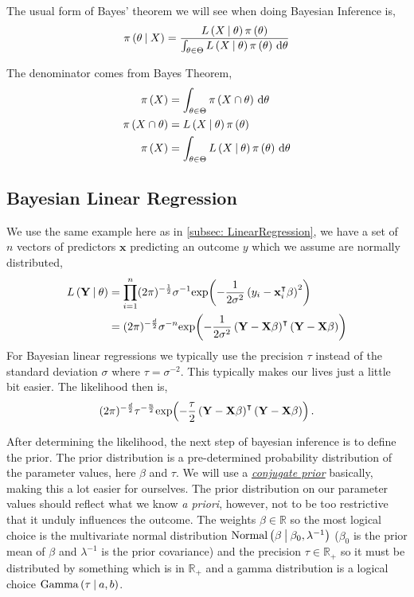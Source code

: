 The usual form of Bayes' theorem we will see when doing Bayesian Inference is,
\begin{align}
    \pi \left( \theta \:\middle|\: X \right) = \frac{L\left( X \:\middle|\: \theta \right)\pi\left( \theta \right)}{\int_{\theta\in\Theta} L\left( X \:\middle|\: \theta \right)\pi\left( \theta \right) \,\mathrm{d} \theta}
\end{align}

The denominator comes from Bayes Theorem,
\begin{align*}
    \pi\left( X \right) &= \int_{\theta\in\Theta} \pi\left( X\cap\theta \right) \,\mathrm{d} \theta\\
    \pi\left( X\cap\theta \right) &= L\left( X \:\middle|\: \theta \right)\pi\left( \theta \right) \\ 
    \pi\left( X \right) &= \int_{\theta\in\Theta} L\left( X \:\middle|\: \theta \right)\pi\left( \theta \right) \,\mathrm{d} \theta
\end{align*}

\subsection{Bayesian Linear Regression}

We use the same example here as in \ref{subsec: LinearRegression}, we have a set of $n$ vectors of predictors $\mathbf{x}$ predicting an outcome $y$ which we assume are normally distributed,
\begin{align*}
    L\left( \mathbf{Y} \:\middle|\: \theta \right) &= \prod_{i=1}^{n} (2\pi)^{-\frac{1}{2}}\sigma^{-1}\mathrm{exp}\!\left( -\frac{1}{2\sigma^2}\left(y_i - \mathbf{x}_i^\intercal\beta \right)^2 \right)\\
    &= (2\pi)^{-\frac{d}{2}}\sigma^{-n}\mathrm{exp}\!\left( -\frac{1}{2\sigma^2}\left(\mathbf{Y} - \mathbf{X}\beta\right)^\intercal\left(\mathbf{Y} - \mathbf{X}\beta\right) \right)
\end{align*}
For Bayesian linear regressions we typically use the precision $\tau$ instead of the standard deviation $\sigma$ where $\tau = \sigma^{-2}$. This typically makes our lives just a little bit easier. The likelihood then is,
\begin{align*}
    (2\pi)^{-\frac{d}{2}}\tau^{-\frac{n}{2}}\mathrm{exp}\!\left( -\frac{\tau}{2}\left(\mathbf{Y} - \mathbf{X}\beta\right)^\intercal\left(\mathbf{Y} - \mathbf{X}\beta\right) \right).
\end{align*}

After determining the likelihood, the next step of bayesian inference is to define the prior. The prior distribution is a pre-determined probability distribution of the parameter values, here $\beta$ and $\tau$. We will use a \href{https://en.wikipedia.org/wiki/Conjugate_prior}{\textit{conjugate prior}} basically, making this a lot easier for ourselves. The prior distribution on our parameter values should reflect what we know \textit{a priori}, however, not to be too restrictive that it unduly influences the outcome. The weights $\beta\in\mathbb{R}$ so the most logical choice is the multivariate normal distribution $\mathrm{Normal}\left( \beta \:\middle|\: \beta_0,\lambda^{-1} \right)$ ($\beta_0$ is the prior mean of $\beta$ and $\lambda^{-1}$ is the prior covariance) and the precision $\tau\in\mathbb{R}_+$ so it must be distributed by something which is in $\mathbb{R}_+$ and a gamma distribution is a logical choice $\mathrm{Gamma}\left( \tau \:\middle|\: a,b \right)$. 

